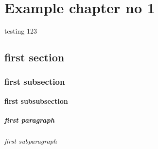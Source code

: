 \documentclass{memoir}
\begin{document}
\newpage
\begin{KeepFromToc}
	\tableofcontents 
	\thispagestyle{empty}
\end{KeepFromToc}
\newpage


\chapter[Whatever description you want in TOC]{\\ Example chapter no 1}
testing 123
\section{first section}

\subsection{first subsection}

\subsubsection{first subsubsection}

\paragraph{first paragraph}

\subparagraph{first subparagraph}

%
%
\end{document}
